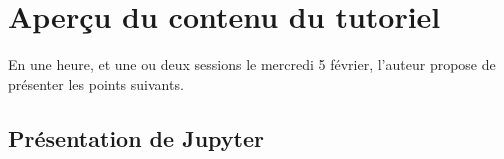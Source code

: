 \documentclass[runningheads]{llncs}
\newcommand{\Jupyter}{\textbf{Jupyter}}
\begin{document}


\section{Aperçu du contenu du tutoriel}

En une heure, et une ou deux sessions le mercredi 5 février, l'auteur propose de présenter les points suivants.


\subsection*{Présentation de \Jupyter}
\end{document}
